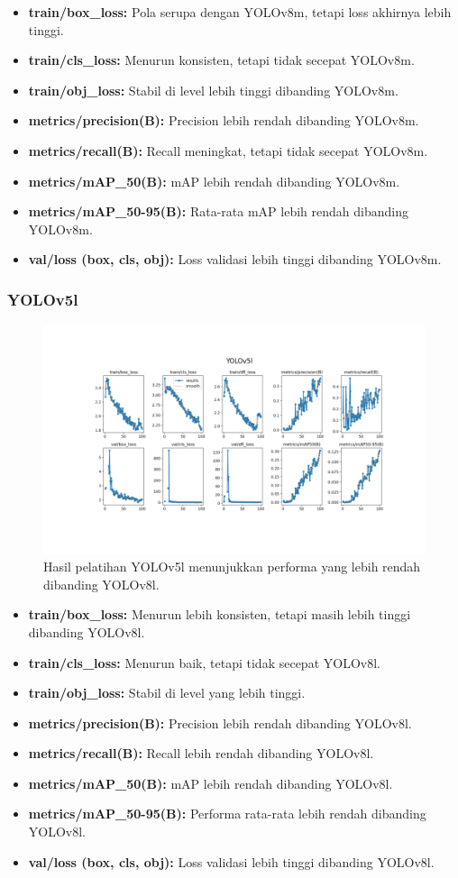 \documentclass[12pt,a4paper]{article}
\begin{document}
\begin{itemize}
    \item \textbf{train/box\_loss:} Pola serupa dengan YOLOv8m, tetapi loss akhirnya lebih tinggi.
    \item \textbf{train/cls\_loss:} Menurun konsisten, tetapi tidak secepat YOLOv8m.
    \item \textbf{train/obj\_loss:} Stabil di level lebih tinggi dibanding YOLOv8m.
    \item \textbf{metrics/precision(B):} Precision lebih rendah dibanding YOLOv8m.
    \item \textbf{metrics/recall(B):} Recall meningkat, tetapi tidak secepat YOLOv8m.
    \item \textbf{metrics/mAP\_50(B):} mAP lebih rendah dibanding YOLOv8m.
    \item \textbf{metrics/mAP\_50-95(B):} Rata-rata mAP lebih rendah dibanding YOLOv8m.
    \item \textbf{val/loss (box, cls, obj):} Loss validasi lebih tinggi dibanding YOLOv8m.
\end{itemize}

\subsubsection{YOLOv5l}

\begin{figure}[H]
    \centering
    \includegraphics[width=0.6\linewidth]{assets/yolov5l_results.png}
    \caption{Hasil pelatihan YOLOv5l menunjukkan performa yang lebih rendah dibanding YOLOv8l.}
    \label{fig:yolov5l_results}
\end{figure}

\begin{itemize}
    \item \textbf{train/box\_loss:} Menurun lebih konsisten, tetapi masih lebih tinggi dibanding YOLOv8l.
    \item \textbf{train/cls\_loss:} Menurun baik, tetapi tidak secepat YOLOv8l.
    \item \textbf{train/obj\_loss:} Stabil di level yang lebih tinggi.
    \item \textbf{metrics/precision(B):} Precision lebih rendah dibanding YOLOv8l.
    \item \textbf{metrics/recall(B):} Recall lebih rendah dibanding YOLOv8l.
    \item \textbf{metrics/mAP\_50(B):} mAP lebih rendah dibanding YOLOv8l.
    \item \textbf{metrics/mAP\_50-95(B):} Performa rata-rata lebih rendah dibanding YOLOv8l.
    \item \textbf{val/loss (box, cls, obj):} Loss validasi lebih tinggi dibanding YOLOv8l.
\end{itemize}
\end{document}

